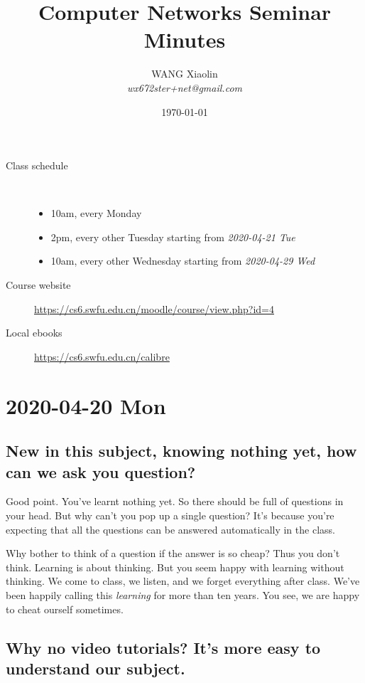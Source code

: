 \documentclass{article}
\author{WANG Xiaolin\\\emph{\small wx672ster+net@gmail.com}}
\date{\today}
\title{Computer Networks Seminar Minutes}
\begin{document}
\maketitle
\tableofcontents

\vspace{1em}

\begin{description}
\item[Class schedule]\, 
  \begin{itemize}
  \item 10am, every Monday
  \item 2pm, every other Tuesday starting from \emph{2020-04-21 Tue}
  \item 10am, every other Wednesday starting from \emph{2020-04-29 Wed}
  \end{itemize}
\item[Course website] \url{https://cs6.swfu.edu.cn/moodle/course/view.php?id=4}
\item[Local ebooks] \url{https://cs6.swfu.edu.cn/calibre}
\end{description}

\printbibliography

\section{2020-04-20 Mon}

\subsection[No questions?]{New in this subject, knowing nothing yet, how can
  we ask you question?}
\label{sec:noquestions}

Good point. You've learnt nothing yet. So there should be full of questions in your
head. But why can't you pop up a single question? It's because you're expecting that all
the questions can be answered automatically in the class.

Why bother to think of a question if the answer is so cheap? Thus you don't think.
Learning is about thinking. But you seem happy with learning without thinking.  We come to
class, we listen, and we forget everything after class. We've been happily calling this
\emph{learning} for more than ten years.  You see, we are happy to cheat ourself
sometimes.

\subsection[No video?]{Why no video tutorials? It's more easy to understand our subject.}
\label{sec:novideo}
\end{document}
